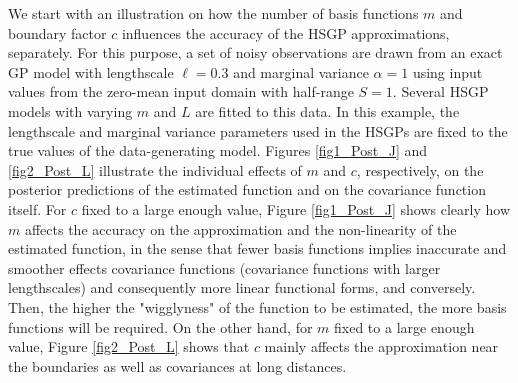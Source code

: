 \documentclass[]{interact}
\theoremstyle{plain}%
\theoremstyle{definition}
\theoremstyle{remark}
\begin{document}
We start with an illustration on how the number of basis functions $m$ and boundary factor $c$ influences the accuracy of the HSGP approximations, separately. For this purpose, a set of noisy observations are drawn from an exact GP model with lengthscale $\ell=0.3$ and marginal variance $\alpha=1$ using input values from the zero-mean input domain with half-range $S=1$. Several HSGP models with varying $m$ and $L$ are fitted to this data. In this example, the lengthscale and marginal variance parameters used in the HSGPs are fixed to the true values of the data-generating model. 
Figures \ref{fig1_Post_J} and \ref{fig2_Post_L} illustrate the individual effects of $m$ and $c$, respectively, on the posterior predictions of the estimated function and on the covariance function itself. For $c$ fixed to a large enough value, Figure \ref{fig1_Post_J} shows clearly how $m$ affects the accuracy on the approximation and the non-linearity of the estimated function, in the sense that fewer basis functions implies inaccurate and smoother effects covariance functions (covariance functions with larger lengthscales) and consequently more linear functional forms, and conversely. 
Then, the higher the "wigglyness" of the function to be estimated, the more basis functions will be required. 
On the other hand, for $m$ fixed to a large enough value, Figure \ref{fig2_Post_L} shows that $c$ mainly affects the approximation near the boundaries as well as covariances at long distances.
\end{document}
